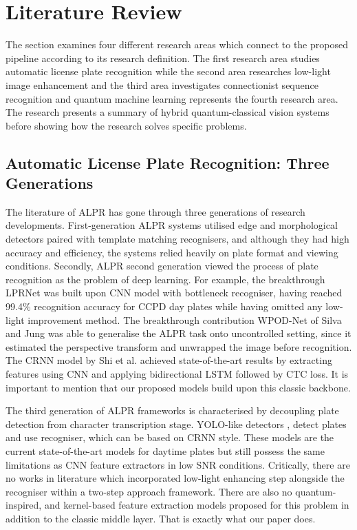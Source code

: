 \documentclass[preprint,12pt]{elsarticle}
\begin{document}
\section{Literature Review}
The section examines four different research areas which connect to the proposed pipeline according to its research definition. The first research area studies automatic license plate recognition while the second area researches low-light image enhancement and the third area investigates connectionist sequence recognition and quantum machine learning represents the fourth research area. The research presents a summary of hybrid quantum-classical vision systems before showing how the research solves specific problems.

\subsection{Automatic License Plate Recognition: Three Generations}
The literature of ALPR has gone through three generations of research developments. First-generation ALPR systems utilised edge and morphological detectors paired with template matching recognisers, and although they had high accuracy and efficiency, the systems relied heavily on plate format and viewing conditions. Secondly, ALPR second generation viewed the process of plate recognition as the problem of deep learning. For example, the breakthrough LPRNet \cite{b14} was built upon CNN model with bottleneck recogniser, having reached 99.4\% recognition accuracy for CCPD day plates while having omitted any low-light improvement method. The breakthrough contribution WPOD-Net of Silva and Jung \cite{b13} was able to generalise the ALPR task onto uncontrolled setting, since it estimated the perspective transform and unwrapped the image before recognition. The CRNN model \cite{b12} by Shi et al. achieved state-of-the-art results by extracting features using CNN and applying bidirectional LSTM followed by CTC \cite{b3} loss. It is important to mention that our proposed models build upon this classic backbone.

The third generation of ALPR frameworks is characterised by decoupling plate detection from character transcription stage. YOLO-like detectors \cite{b15}, \cite{b16} detect plates and use recogniser, which can be based on CRNN style. These models are the current state-of-the-art models for daytime plates but still possess the same limitations as CNN feature extractors in low SNR conditions. Critically, there are no works in literature which incorporated low-light enhancing step alongside the recogniser within a two-step approach framework. There are also no quantum-inspired, and kernel-based feature extraction models proposed for this problem in addition to the classic middle layer. That is exactly what our paper does.
\end{document}
